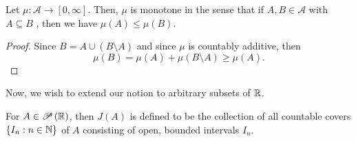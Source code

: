 \begin{proposition}
	Let \(\mu: \mathscr{A} \to \left[ 0, \infty \right]  \). Then, \( \mu\) is monotone in the sense that if \(A, B \in \mathscr{A}\) with \(A \subseteq B\) , then we have \( \mu\left( A \right)  \le \mu\left( B \right) \).
\end{proposition}
\begin{proof}
	Since \(B = A \cup \left( B \setminus A \right) \)	 and since \( \mu\) is countably additive, then \[
		\mu\left( B \right)  = \mu\left( A \right)  + \mu\left( B \setminus A \right) \ge \mu\left( A \right)
	.\]
\end{proof}
Now, we wish to extend our notion to arbitrary subsets of \(\mathbb{R}\).
\begin{definition}
	For \(A \in \mathscr{P}\left( \mathbb{R} \right) \), then \(J\left( A \right) \) is defined to be the collection of all countable covers \(\{I_{n} : n \in \mathbb{N}\} \) of \(A\) consisting of open, bounded intervals \(I_{n}\).
\end{definition}
